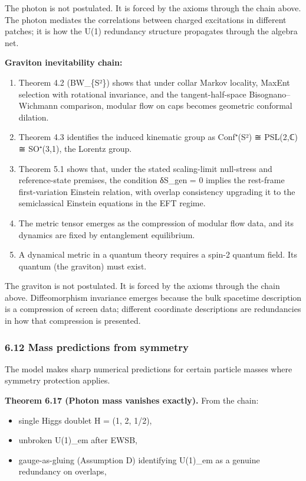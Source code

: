 The photon is not postulated. It is forced by the axioms through the chain above. The photon mediates the correlations between charged excitations in different patches; it is how the U(1) redundancy structure propagates through the algebra net.

\textbf{Graviton inevitability chain:}

\begin{enumerate}
\def\labelenumi{\arabic{enumi}.}
\tightlist
\item
  Theorem 4.2 (BW\_\{S²\}) shows that under collar Markov locality, MaxEnt selection with rotational invariance, and the tangent-half-space Bisognano--Wichmann comparison, modular flow on caps becomes geometric conformal dilation.
\item
  Theorem 4.3 identifies the induced kinematic group as Conf⁺(S²) ≅ PSL(2,ℂ) ≅ SO⁺(3,1), the Lorentz group.
\item
  Theorem 5.1 shows that, under the stated scaling-limit null-stress and reference-state premises, the condition δS\_gen = 0 implies the rest-frame first-variation Einstein relation, with overlap consistency upgrading it to the semiclassical Einstein equations in the EFT regime.
\item
  The metric tensor emerges as the compression of modular flow data, and its dynamics are fixed by entanglement equilibrium.
\item
  A dynamical metric in a quantum theory requires a spin-2 quantum field. Its quantum (the graviton) must exist.
\end{enumerate}

The graviton is not postulated. It is forced by the axioms through the chain above. Diffeomorphism invariance emerges because the bulk spacetime description is a compression of screen data; different coordinate descriptions are redundancies in how that compression is presented.

\subsubsection{6.12 Mass predictions from symmetry}\label{612-mass-predictions-from-symmetry}

The model makes sharp numerical predictions for certain particle masses where symmetry protection applies.

\textbf{Theorem 6.17 (Photon mass vanishes exactly).} From the chain:

\begin{itemize}
\tightlist
\item
  single Higgs doublet H = (1, 2, 1/2),
\item
  unbroken U(1)\_em after EWSB,
\item
  gauge-as-gluing (Assumption D) identifying U(1)\_em as a genuine redundancy on overlaps,
\end{itemize}

